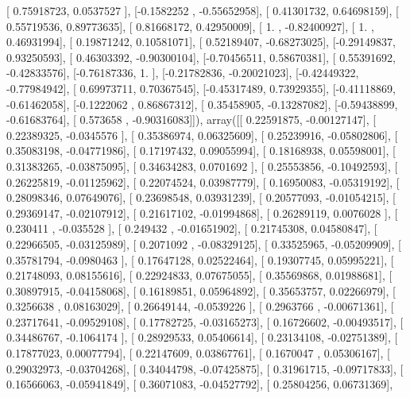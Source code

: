 \documentclass{article}
\begin{document}
       [ 0.75918723,  0.0537527 ],
       [-0.1582252 , -0.55652958],
       [ 0.41301732,  0.64698159],
       [ 0.55719536,  0.89773635],
       [ 0.81668172,  0.42950009],
       [ 1.        , -0.82400927],
       [ 1.        ,  0.46931994],
       [ 0.19871242,  0.10581071],
       [ 0.52189407, -0.68273025],
       [-0.29149837,  0.93250593],
       [ 0.46303392, -0.90300104],
       [-0.70456511,  0.58670381],
       [ 0.55391692, -0.42833576],
       [-0.76187336,  1.        ],
       [-0.21782836, -0.20021023],
       [-0.42449322, -0.77984942],
       [ 0.69973711,  0.70367545],
       [-0.45317489,  0.73929355],
       [-0.41118869, -0.61462058],
       [-0.1222062 ,  0.86867312],
       [ 0.35458905, -0.13287082],
       [-0.59438899, -0.61683764],
       [ 0.573658  , -0.90316083]]), array([[ 0.22591875, -0.00127147],
       [ 0.22389325, -0.0345576 ],
       [ 0.35386974,  0.06325609],
       [ 0.25239916, -0.05802806],
       [ 0.35083198, -0.04771986],
       [ 0.17197432,  0.09055994],
       [ 0.18168938,  0.05598001],
       [ 0.31383265, -0.03875095],
       [ 0.34634283,  0.0701692 ],
       [ 0.25553856, -0.10492593],
       [ 0.26225819, -0.01125962],
       [ 0.22074524,  0.03987779],
       [ 0.16950083, -0.05319192],
       [ 0.28098346,  0.07649076],
       [ 0.23698548,  0.03931239],
       [ 0.20577093, -0.01054215],
       [ 0.29369147, -0.02107912],
       [ 0.21617102, -0.01994868],
       [ 0.26289119,  0.0076028 ],
       [ 0.230411  , -0.035528  ],
       [ 0.249432  , -0.01651902],
       [ 0.21745308,  0.04580847],
       [ 0.22966505, -0.03125989],
       [ 0.2071092 , -0.08329125],
       [ 0.33525965, -0.05209909],
       [ 0.35781794, -0.0980463 ],
       [ 0.17647128,  0.02522464],
       [ 0.19307745,  0.05995221],
       [ 0.21748093,  0.08155616],
       [ 0.22924833,  0.07675055],
       [ 0.35569868,  0.01988681],
       [ 0.30897915, -0.04158068],
       [ 0.16189851,  0.05964892],
       [ 0.35653757,  0.02266979],
       [ 0.3256638 ,  0.08163029],
       [ 0.26649144, -0.0539226 ],
       [ 0.2963766 , -0.00671361],
       [ 0.23717641, -0.09529108],
       [ 0.17782725, -0.03165273],
       [ 0.16726602, -0.00493517],
       [ 0.34486767, -0.1064174 ],
       [ 0.28929533,  0.05406614],
       [ 0.23134108, -0.02751389],
       [ 0.17877023,  0.00077794],
       [ 0.22147609,  0.03867761],
       [ 0.1670047 ,  0.05306167],
       [ 0.29032973, -0.03704268],
       [ 0.34044798, -0.07425875],
       [ 0.31961715, -0.09717833],
       [ 0.16566063, -0.05941849],
       [ 0.36071083, -0.04527792],
       [ 0.25804256,  0.06731369],
\end{document}
